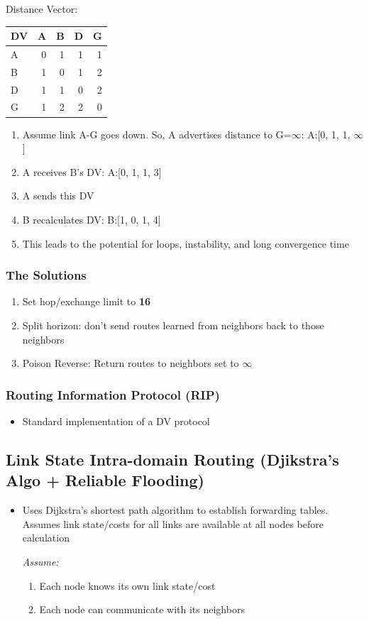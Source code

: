 \documentclass[11pt]{article}
\begin{document}
Distance Vector:
\begin{center}
\begin{tabular}{lrrrr}
\hline
DV & A & B & D & G\\
\hline
A & 0 & 1 & 1 & 1\\
B & 1 & 0 & 1 & 2\\
D & 1 & 1 & 0 & 2\\
G & 1 & 2 & 2 & 0\\
\hline
\end{tabular}
\end{center}

\begin{enumerate}
\item Assume link A-G goes down. So, A advertises distance to G=\(\infty\):
A:[0, 1, 1, \(\infty\)]
\item A receives B's DV: A:[0, 1, 1, 3]
\item A sends this DV
\item B recalculates DV: B:[1, 0, 1, 4]
\item This leads to the potential for loops, instability, and long
convergence time
\end{enumerate}

\subsubsection{The Solutions}
\label{sec:orgheadline79}
\begin{enumerate}
\item Set hop/exchange limit to \textbf{16}
\item Split horizon: don't send routes learned from neighbors back to
those neighbors
\item Poison Reverse: Return routes to neighbors set to \(\infty\)
\end{enumerate}

\subsubsection{Routing Information Protocol (RIP)}
\label{sec:orgheadline80}
\begin{itemize}
\item Standard implementation of a DV protocol
\end{itemize}

\subsection{Link State Intra-domain Routing (Djikstra's Algo + Reliable Flooding)}
\label{sec:orgheadline83}
\begin{itemize}
\item Uses Dijkstra's shortest path algorithm to establish forwarding
tables. Assumes link state/costs for all links are available at all
nodes before calculation 

\emph{Assume:}
\begin{enumerate}
\item Each node knows its own link state/cost
\item Each node can communicate with its neighbors
\end{enumerate}
\end{itemize}
\end{document}
